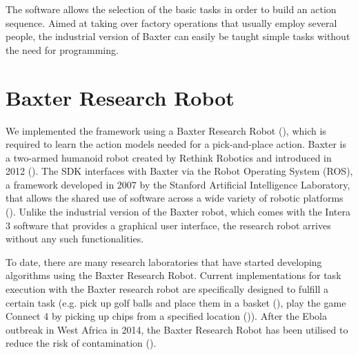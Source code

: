 The software allows the selection of the basic tasks in order to build an action sequence.
Aimed at taking over factory operations that usually employ several people, the industrial version of Baxter can easily be taught simple tasks without the need for programming.


\section{Baxter Research Robot}
We implemented the framework using a Baxter Research Robot (\cite{robotics2013baxter}), which is required to learn the action models needed for a pick-and-place action.
Baxter is a two-armed humanoid robot created by Rethink Robotics and introduced in 2012 (\cite{robotics2013baxter}).
The SDK interfaces with Baxter via the Robot Operating System (ROS), a framework developed in 2007 by the Stanford Artificial Intelligence Laboratory, that allows the shared use of software across a wide variety of robotic platforms (\cite{fernandez2015learning}).
Unlike the industrial version of the Baxter robot, which comes with the Intera 3 software that provides a graphical user interface, the research robot arrives without any such functionalities.

To date, there are many research laboratories that have started developing algorithms using the Baxter Research Robot.
Current implementations for task execution with the Baxter research robot are specifically designed to fulfill a certain task (e.g.
pick up golf balls and place them in a basket (\cite{BaxterGolf}), play the game Connect 4 by picking up chips from a specified location (\cite{Connect4})).
After the Ebola outbreak in West Africa in 2014, the Baxter Research Robot has been utilised to reduce the risk of contamination (\cite{Ebola}).

